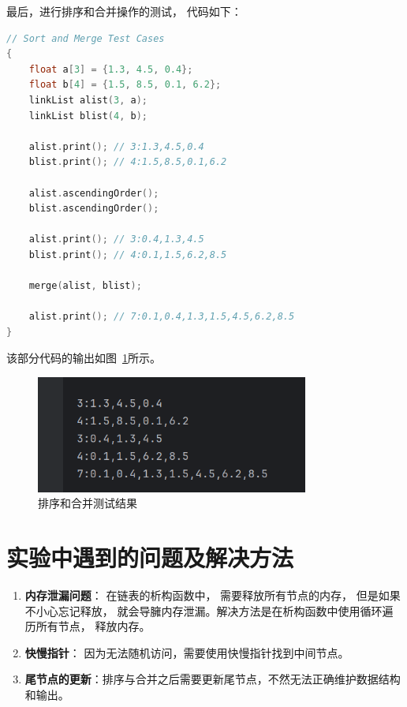 \documentclass{csexp}
\begin{document}
最后，进行排序和合并操作的测试， 代码如下：

\begin{lstlisting}[language=C++]
// Sort and Merge Test Cases
{
    float a[3] = {1.3, 4.5, 0.4};
    float b[4] = {1.5, 8.5, 0.1, 6.2};
    linkList alist(3, a);
    linkList blist(4, b);

    alist.print(); // 3:1.3,4.5,0.4
    blist.print(); // 4:1.5,8.5,0.1,6.2

    alist.ascendingOrder();
    blist.ascendingOrder();

    alist.print(); // 3:0.4,1.3,4.5
    blist.print(); // 4:0.1,1.5,6.2,8.5

    merge(alist, blist);

    alist.print(); // 7:0.1,0.4,1.3,1.5,4.5,6.2,8.5
}
\end{lstlisting}

该部分代码的输出如图~\ref{fig:sort-merge}所示。

\begin{figure}[htbp]
    \centering
    \includegraphics[width=0.8\textwidth]{exp1-3.png}
    \caption{排序和合并测试结果}
    \label{fig:sort-merge}
\end{figure}

\section{实验中遇到的问题及解决方法}

\begin{enumerate}
    \item \textbf{内存泄漏问题}： 在链表的析构函数中， 需要释放所有节点的内存， 但是如果不小心忘记释放， 就会导臃内存泄漏。解决方法是在析构函数中使用循环遍历所有节点， 释放内存。
    \item \textbf{快慢指针}： 因为无法随机访问，需要使用快慢指针找到中间节点。
    \item \textbf{尾节点的更新}：排序与合并之后需要更新尾节点，不然无法正确维护数据结构和输出。
\end{enumerate}
\end{document}

